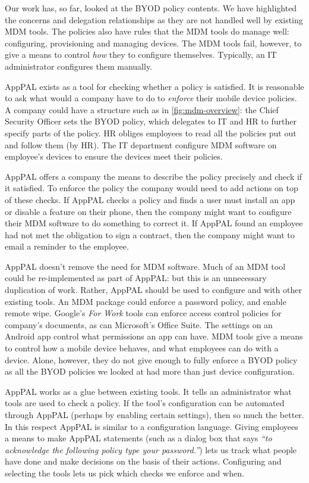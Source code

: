\documentclass[thesis.tex]{subfiles}
\begin{document}
Our work has, so far, looked at the BYOD policy contents. We have highlighted
the concerns and delegation relationships as they are not handled well by
existing \ac{MDM} tools. The policies also have rules that the \ac{MDM} tools do
manage well: configuring, provisioning and managing devices. The \ac{MDM} tools
fail, however, to give a means to control \emph{how} they to configure
themselves. Typically, an IT administrator configures them manually.

AppPAL exists as a tool for checking whether a policy is satisfied.
It is reasonable to ask what would a company have to do to
\emph{enforce} their mobile device policies. A company could have a
structure such as in \autoref{fig:mdm-overview}: the Chief Security
Officer sets the BYOD policy, which delegates to IT and HR to further
specify parts of the policy.  HR obliges employees to read all the
policies put out and follow them (by HR).  The IT department configure \ac{MDM} software on
employee's devices to ensure the devices meet their policies.

AppPAL offers a company the means to describe the policy precisely and check if
it satisfied. To enforce the policy the company would need to add actions on top
of these checks. If AppPAL checks a policy and finds a user must install an app
or disable a feature on their phone, then the company might want to configure
their \ac{MDM} software to do something to correct it. If AppPAL found an
employee had not met the obligation to sign a contract, then the company might
want to email a reminder to the employee.

AppPAL doesn't remove the need for \ac{MDM} software. Much of an \ac{MDM} tool
could be re-implemented as part of AppPAL: but this is an unnecessary
duplication of work. Rather, AppPAL should be used to configure and with other
existing tools. An \ac{MDM} package could enforce a password policy, and enable
remote wipe. Google's \emph{For Work} tools can enforce access control policies
for company's documents, as can Microsoft's Office Suite. The settings on an
Android app control what permissions an app can have. \ac{MDM} tools give a
means to control how a mobile device behaves, and what employees can do with a
device. Alone, however, they do not give enough to fully enforce a \ac{BYOD}
policy as all the \ac{BYOD} policies we looked at had more than just device
configuration.

AppPAL works as a glue between existing tools. It tells an administrator what
tools are used to check a policy. If the tool's configuration can be automated
through AppPAL (perhaps by enabling certain settings), then so much the better.
In this respect AppPAL is similar to a configuration language. Giving employees
a means to make AppPAL statements (such as a dialog box that says \emph{``to
acknowledge the following policy type your password.''}) lets us track what
people have done and make decisions on the basis of their actions. Configuring
and selecting the tools lets us pick which checks we enforce and when.

%  
\end{document}
